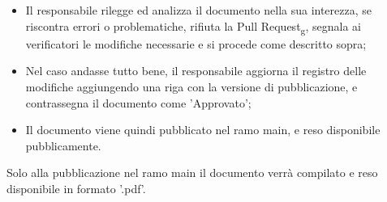 \begin{itemize}
\begin{itemize}
                \item Il responsabile rilegge ed analizza il documento nella sua interezza, se riscontra errori o problematiche, rifiuta la Pull Request\textsubscript{g}, segnala ai verificatori le modifiche necessarie e si procede come descritto sopra;
                \item Nel caso andasse tutto bene, il responsabile aggiorna il registro delle modifiche aggiungendo una riga con la versione di pubblicazione, e contrassegna il documento come 'Approvato';
                \item Il documento viene quindi pubblicato nel ramo main, e reso disponibile pubblicamente.
            \end{itemize}
        \end{itemize}
        Solo alla pubblicazione nel ramo main il documento verrà compilato e reso disponibile in formato '.pdf'.
        \newpage

